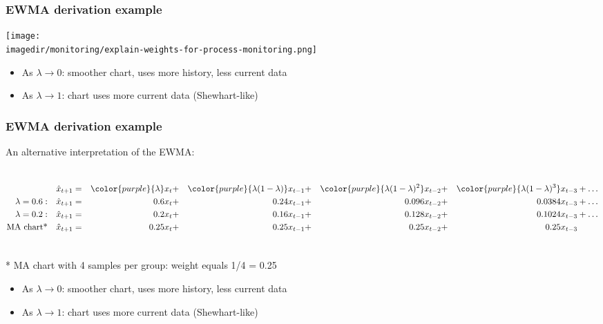 \begin{frame}\frametitle{EWMA derivation example}
	\begin{center}
		\texttt{[image: \\imagedir/monitoring/explain-weights-for-process-monitoring.png]}
	\end{center}
	\vspace{-16pt}
	\begin{itemize}
		\item	As $\lambda \rightarrow 0$: smoother chart, uses more history, less current data
		\item	As $\lambda \rightarrow 1$: chart uses more current data (Shewhart-like)
	\end{itemize}
\end{frame}

\begin{frame}\frametitle{EWMA derivation example}
	
	An alternative interpretation of the EWMA:
	
	\vspace{12pt}
	\begin{columns}[t]
			{\footnotesize
			\begin{align*}
					           && \hat{x}_{t+1} &=& {\color{purple}{\lambda}} x_t &+& {\color{purple}{\lambda(1-\lambda)}} x_{t-1} &+& {\color{purple}{\lambda(1-\lambda)^2}} x_{t-2} &+& {\color{purple}{\lambda(1-\lambda)^3}} x_{t-3} &+ \ldots\\
				\lambda = 0.6: && \hat{x}_{t+1} &=& 0.6 x_t     &+& 0.24 x_{t-1}               &+& 0.096 x_{t-2}                &+& 0.0384 x_{t-3} &+ \ldots      \\
				\lambda = 0.2: && \hat{x}_{t+1} &=& 0.2 x_t     &+& 0.16 x_{t-1}               &+& 0.128 x_{t-2}                &+& 0.1024 x_{t-3} &+ \ldots       \\
				\text{MA chart*}&& \hat{x}_{t+1} &=& 0.25 x_t    &+& 0.25 x_{t-1}               &+& 0.25 x_{t-2}                 &+& 0.25 x_{t-3}  &     
			\end{align*}}

	\end{columns}

	* MA chart with 4 samples per group: weight equals 1/4 = 0.25

	\vspace{16pt}
	\begin{itemize}
		\item	As $\lambda \rightarrow 0$: smoother chart, uses more history, less current data
		\item	As $\lambda \rightarrow 1$: chart uses more current data (Shewhart-like)
	\end{itemize}
\end{frame}


